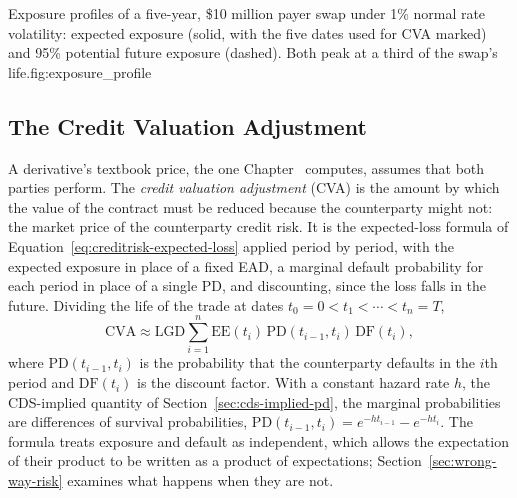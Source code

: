 \documentclass[../ai_in_finance]{subfiles}
\begin{document}
\begin{bookfigure}{Exposure profiles of a five-year, \$10 million payer swap under 1\% normal rate volatility: expected exposure (solid, with the five dates used for CVA marked) and 95\% potential future exposure (dashed). Both peak at a third of the swap's life.}{fig:exposure_profile}
\end{bookfigure}

\subsection{The Credit Valuation Adjustment}
\label{sec:cva}

A derivative's textbook price, the one Chapter~ computes, assumes that both parties perform. The \emph{credit valuation adjustment} (CVA) is the amount by which the value of the contract must be reduced because the counterparty might not: the market price of the counterparty credit risk. It is the expected-loss formula of Equation~\eqref{eq:creditrisk-expected-loss} applied period by period, with the expected exposure in place of a fixed EAD, a marginal default probability for each period in place of a single PD, and discounting, since the loss falls in the future. Dividing the life of the trade at dates $t_0 = 0 < t_1 < \cdots < t_n = T$,
\begin{equation}
\label{eq:creditrisk-cva}
\text{CVA} \approx \text{LGD} \sum_{i=1}^{n} \text{EE}(t_i)\, \text{PD}(t_{i-1}, t_i)\, \text{DF}(t_i),
\end{equation}
where $\text{PD}(t_{i-1}, t_i)$ is the probability that the counterparty defaults in the $i$th period and $\text{DF}(t_i)$ is the discount factor. With a constant hazard rate $h$, the CDS-implied quantity of Section~\ref{sec:cds-implied-pd}, the marginal probabilities are differences of survival probabilities, $\text{PD}(t_{i-1}, t_i) = e^{-h t_{i-1}} - e^{-h t_i}$. The formula treats exposure and default as independent, which allows the expectation of their product to be written as a product of expectations; Section~\ref{sec:wrong-way-risk} examines what happens when they are not.
\end{document}
